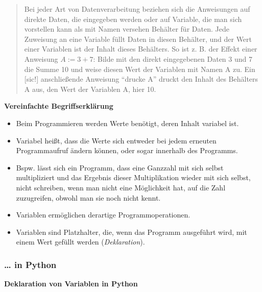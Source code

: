 \begin{quote}
Bei jeder Art von Datenverarbeitung beziehen sich die Anweisungen auf
direkte Daten, die eingegeben werden oder auf Variable, die man sich
vorstellen kann als mit Namen versehen Behälter für Daten. Jede
Zuweisung an eine Variable füllt Daten in diesen Behälter, und der Wert
einer Variablen ist der Inhalt dieses Behälters. So ist z. B. der Effekt
einer Anweisung $A:= 3 + 7$: Bilde mit den direkt eingegebenen Daten 3
und 7 die Summe 10 und weise diesen Wert der Variablen mit Namen A zu.
Ein {[}sic!{]} anschließende Anweisung ``drucke A'' druckt den Inhalt
des Behälters A aus, den Wert der Variablen A, hier 10.
\end{quote}



\vspace{0.5cm}\par\noindent\textbf{Vereinfachte Begriffserklärung}\vspace{0.5cm}

\begin{itemize}
\itemsep1pt\parskip0pt
\item
  {Beim Programmieren werden Werte benötigt, deren Inhalt variabel ist.}
\item
  {Variabel heißt, dass die Werte sich entweder bei jedem erneuten
  Programmaufruf ändern können, oder sogar innerhalb des Programms.}
\item
  {Bspw. lässt sich ein Programm, dass eine Ganzzahl mit sich selbst
  multipliziert und das Ergebnis dieser Multiplikation wieder mit sich
  selbst, nicht schreiben, wenn man nicht eine Möglichkeit hat, auf die
  Zahl zuzugreifen, obwohl man sie noch nicht kennt.}
\item
  {Variablen ermöglichen derartige Programmoperationen.}
\item
  {Variablen sind Platzhalter, die, wenn das Programm ausgeführt wird,
  mit einem Wert gefüllt werden (\emph{Deklaration}).}
\end{itemize}


\subsubsection{\texorpdfstring{{\ldots{} in
Python}}{\ldots{} in Python}}

\vspace{0.5cm}\par\noindent\textbf{Deklaration von Variablen in Python}\vspace{0.5cm}

